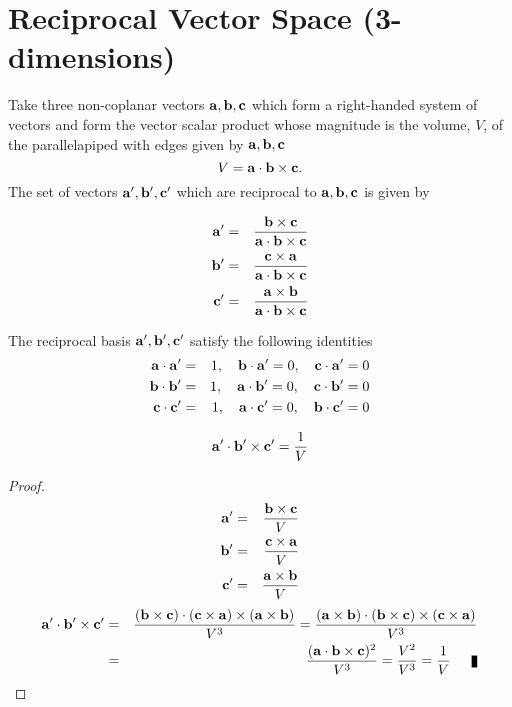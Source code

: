 \section{Reciprocal Vector Space (3-dimensions)}
Take three non-coplanar vectors ${\bf a}, {\bf b}, {\bf c}$ which form a right-handed system of vectors and form the vector scalar product whose magnitude is the volume, $V$, of the parallelapiped with edges given by ${\bf a}, {\bf b}, {\bf c}$ 
\[ V = {\bf a}\cdot{\bf b} \times {\bf c}. \] The set of vectors ${\bf a'}, {\bf b'}, {\bf c'}$ which are reciprocal to ${\bf a}, {\bf b}, {\bf c}$  is given by

\begin{eqnarray*}
{\bf a'}&=& { {\bf b} \times{\bf c}\over {\bf a}\cdot{\bf b} \times {\bf c}} \\   
{\bf b'}&=& { {\bf c} \times{\bf a}\over {\bf a}\cdot{\bf b} \times {\bf c}} \\
{\bf c'}&=& { {\bf a} \times{\bf b}\over {\bf a}\cdot{\bf b} \times {\bf c}} \\
\end{eqnarray*}

The reciprocal basis ${\bf a'}, {\bf b'}, {\bf c'}$ satisfy the following identities
\begin{eqnarray*}
{\bf a}\cdot {\bf a'}&=& 1, \quad {\bf b}\cdot {\bf a'} = 0, \quad {\bf c}\cdot {\bf a'} =0 \\   
{\bf b}\cdot {\bf b'}&=& 1, \quad {\bf a}\cdot {\bf b'} = 0, \quad {\bf c}\cdot {\bf b'} =0  \\
{\bf c}\cdot {\bf c'}&=& 1,  \quad {\bf a}\cdot {\bf c'} = 0, \quad {\bf b}\cdot {\bf c'} =0 \\
\end{eqnarray*}
 
\begin{theorem}[Reciprocal Basis has Reciprocal Volume = 1/V]
\[ {\bf a'}\cdot{\bf b'} \times {\bf c'} = {1\over V}  \]
\end{theorem}
\begin{proof}
\begin{eqnarray*}
{\bf a'}&=& { {\bf b} \times{\bf c}\over V} \\   
{\bf b'}&=& { {\bf c} \times{\bf a}\over V} \\
{\bf c'}&=& { {\bf a} \times{\bf b}\over V} \\
\end{eqnarray*}
\begin{eqnarray*}
{\bf a'}\cdot{\bf b'} \times {\bf c'}  &=& {({\bf b}\times {\bf c})\cdot({\bf c}\times{\bf a})\times({\bf a}\times {\bf b})\over V^3} = {({\bf a}\times {\bf b})\cdot ({\bf b}\times {\bf c})\times({\bf c}\times{\bf a}) \over V^3} \\
                                                       &=& {({\bf a}\cdot {\bf b} \times {\bf c})^2\over V^3} = {V^2\over V^3} = {1\over V}\qed
\end{eqnarray*}
\end{proof}